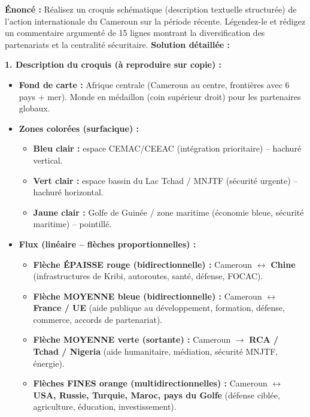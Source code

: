 \documentclass[11pt]{article}
\begin{document}
\begin{exoresolu}
\textbf{Énoncé :} Réalisez un croquis schématique (description textuelle structurée) de l'action internationale du Cameroun sur la période récente. Légendez-le et rédigez un commentaire argumenté de 15 lignes montrant la diversification des partenariats et la centralité sécuritaire.
\tcblower
\textbf{Solution détaillée :}

\textbf{1. Description du croquis (à reproduire sur copie) :}
\begin{itemize}
    \item \textbf{Fond de carte :} Afrique centrale (Cameroun au centre, frontières avec 6 pays + mer). Monde en médaillon (coin supérieur droit) pour les partenaires globaux.
    \item \textbf{Zones colorées (surfacique) :}
    \begin{itemize}
        \item \textcolor{popblue}{\textbf{Bleu clair :}} espace CEMAC/CEEAC (intégration prioritaire) -- hachuré vertical.
        \item \textcolor{popgreen}{\textbf{Vert clair :}} espace bassin du Lac Tchad / MNJTF (sécurité urgente) -- hachuré horizontal.
        \item \textcolor{popgold}{\textbf{Jaune clair :}} Golfe de Guinée / zone maritime (économie bleue, sécurité maritime) -- pointillé.
    \end{itemize}
    \item \textbf{Flux (linéaire -- flèches proportionnelles) :}
    \begin{itemize}
        \item \textbf{Flèche ÉPAISSE rouge (bidirectionnelle) :} Cameroun $\leftrightarrow$ \textbf{Chine} (infrastructures de Kribi, autoroutes, santé, défense, FOCAC).
        \item \textbf{Flèche MOYENNE bleue (bidirectionnelle) :} Cameroun $\leftrightarrow$ \textbf{France / UE} (aide publique au développement, formation, défense, commerce, accords de partenariat).
        \item \textbf{Flèche MOYENNE verte (sortante) :} Cameroun $\rightarrow$ \textbf{RCA / Tchad / Nigeria} (aide humanitaire, médiation, sécurité MNJTF, énergie).
        \item \textbf{Flèches FINES orange (multidirectionnelles) :} Cameroun $\leftrightarrow$ \textbf{USA, Russie, Turquie, Maroc, pays du Golfe} (défense ciblée, agriculture, éducation, investissement).

\end{itemize}
\end{itemize}
\end{exoresolu}
\end{document}
